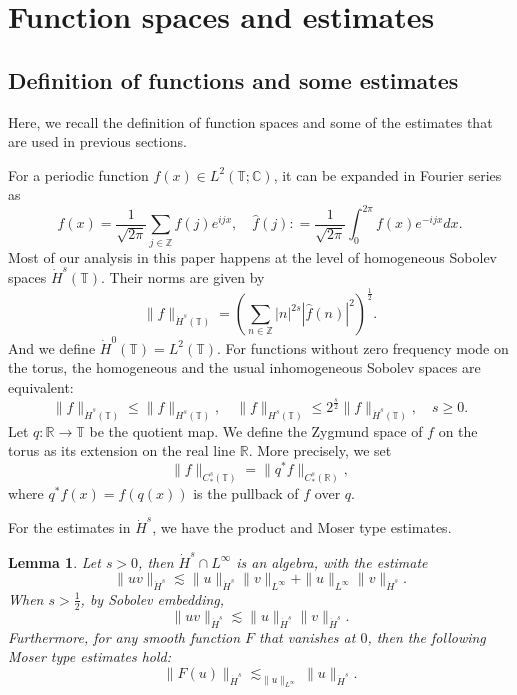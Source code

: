 \documentclass[12pt]{amsart}
\newtheorem{lemma}[theorem]{Lemma}
\theoremstyle{remark}
\theoremstyle{definition}
\numberwithin{equation}{section}
\begin{document}
\appendix
\section{Function spaces and  estimates} \label{s:Appendix}
\subsection{Definition of functions and some estimates}
Here, we recall the definition of function spaces and some of the estimates that are used in previous sections.

For a periodic function $f(x)\in L^2(\mathbb{T}; \mathbb{C})$, it can be expanded in Fourier series as
\begin{equation*}
f(x) = \frac{1}{\sqrt{2\pi}}\sum_{j\in \mathbb{Z}} \hat{f}(j)e^{ijx}, \quad \hat{f}(j): = \frac{1}{\sqrt{2\pi}}\int_{0}^{2\pi}f(x)e^{-ijx}dx.
\end{equation*}
Most of our analysis in this paper happens at the level of  homogeneous Sobolev spaces $\dot{H}^s(\mathbb{T})$. 
Their norms are given by
\begin{equation*}
    \|f\|_{\dot{H}^s(\mathbb{T})} = \left( \sum_{n\in \mathbb{Z}} |n|^{2s} |\hat{f}(n)|^2\right)^{\frac{1}{2}}. 
\end{equation*}
And we define $\dot{H}^0(\mathbb{T}) =L^2(\mathbb{T})$.
For functions without zero frequency mode on the torus, the homogeneous and the usual inhomogeneous Sobolev spaces are equivalent:
\begin{equation*}
 \|f\|_{\dot{H}^s(\mathbb{T})} \leq \|f\|_{H^s(\mathbb{T})}, \quad \|f\|_{H^s(\mathbb{T})} \leq 2^\frac{s}{2}\|f\|_{\dot{H}^s(\mathbb{T})}, \quad s\geq 0.
\end{equation*}
Let $q: \mathbb{R} \rightarrow \mathbb{T}$ be the quotient map.
We define the Zygmund space of $f$ on the torus as its extension on the real line $\mathbb{R}$.
More precisely, we set
\begin{equation*}
    \|f\|_{C^s_*(\mathbb{T})} = \|q^{*}f\|_{C^s_*(\mathbb{R})},
\end{equation*}
where $q^{*}f(x) = f(q(x))$ is the pullback of $f$ over $q$.

For the estimates in $\dot{H}^s$, we have the product and Moser type estimates.
\begin{lemma}
    Let $s>0$, then $\dot{H}^s \cap L^\infty$ is an algebra, with the estimate
\begin{equation}
\|uv\|_{\dot{H}^s} \lesssim \|u\|_{\dot{H}^s} \|v\|_{L^\infty} + \|u\|_{L^\infty}\|v\|_{\dot{H}^s}.
\end{equation}
When $s>\frac{1}{2}$, by Sobolev embedding,
\begin{equation}
  \|uv\|_{\dot{H}^s} \lesssim \|u\|_{\dot{H}^s} \|v\|_{\dot{H}^s}.  
\end{equation}
 Furthermore, for any smooth function $F$ that vanishes at $0$, then the following Moser type  estimates hold:
 \begin{equation}
\|F(u)\|_{\dot{H}^s}\lesssim_{\|u\|_{L^\infty}} \|u\|_{\dot{H}^s}. \label{MoserTwo}
    \end{equation}
\end{lemma}
\end{document}
